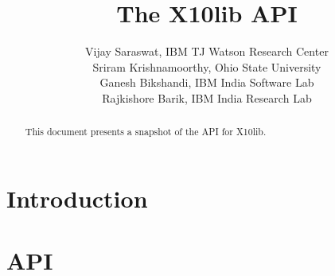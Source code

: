 \documentclass{article}
\def\Xtenlib{{\sf X10lib}}
\begin{document}
\title{The \Xtenlib{} API}
\author{Vijay Saraswat, IBM TJ Watson Research Center \\
  Sriram Krishnamoorthy, Ohio State University \\
  Ganesh Bikshandi, IBM India Software Lab \\
  Rajkishore Barik, IBM India Research Lab}

\maketitle

\thispagestyle{fancy}


\begin{abstract}
This document presents a snapshot of the API for 
\Xtenlib{}. 
\end{abstract}

\section{Introduction}
\section{API}






\end{document}
